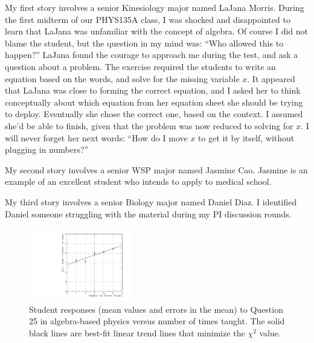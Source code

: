 \documentclass[../../main.tex]{subfiles}
\begin{document}
My first story involves a senior Kinesiology major named LaJana Morris.  During the first midterm of our PHYS135A class, I was shocked and disappointed to learn that LaJana was unfamiliar with the concept of algebra.  Of course I did not blame the student, but the question in my mind was: ``Who allowed this to happen?''  LaJana found the courage to approach me during the test, and ask a question about a problem.  The exercise required the students to write an equation based on the words, and solve for the missing variable $x$.  It appeared that LaJana was close to forming the correct equation, and I asked her to think conceptually about which equation from her equation sheet she should be trying to deploy.  Eventually she chose the correct one, based on the context.  I assumed she'd be able to finish, given that the problem was now reduced to solving for $x$.  I will never forget her next words: ``How do I move $x$ to get it by itself, without plugging in numbers?''  \\ \hspace{0.1cm}

My second story involves a senior WSP major named Jasmine Cao.  Jasmine is an example of an excellent student who intends to apply to medical school. \\ \hspace{0.1cm}

My third story involves a senior Biology major named Daniel Diaz.  I identified Daniel someone struggling with the material during my PI discussion rounds.

\begin{figure}
\centering
\includegraphics[width=0.4\textwidth]{Q25_algebra_based.pdf}
\caption{\label{fig:courses:intro_q25}  Student responses (mean values and errors in the mean) to Question 25 in algebra-based physics versus number of times taught.  The solid black lines are best-fit linear trend lines that minimize the $\chi^2$ value.}
\end{figure}
\end{document}
